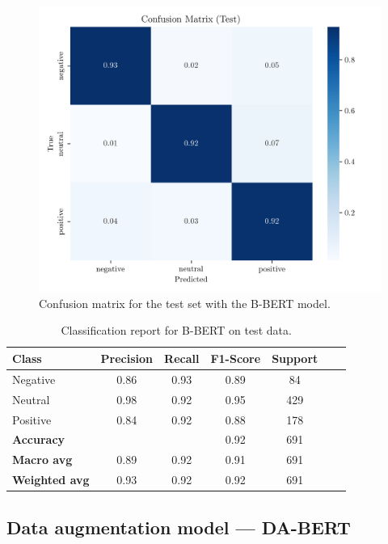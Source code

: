 \documentclass[conference]{IEEEtran}
\begin{document}
\begin{figure}[H]
    \centering
    \includegraphics[width=1\linewidth]{assets/base_bert_confusion_matrix_Test.png}
    \caption{Confusion matrix for the test set with the B-BERT model.}
    \label{fig:base_bert_confusion_matrix_Test}
\end{figure}

\begin{table}[H]
\centering
\caption{Classification report for B-BERT on test data.}
\label{cr_basebert_test}
\begin{tabular}{lcccccc}
\toprule
\textbf{Class} & \textbf{Precision} & \textbf{Recall} & \textbf{F1-Score} & \textbf{Support} \\
\midrule
Negative & 0.86 & 0.93 & 0.89 & 84 \\
Neutral & 0.98 & 0.92 & 0.95 & 429 \\
Positive & 0.84 & 0.92 & 0.88 & 178 \\
\midrule
\textbf{Accuracy} &  &  & 0.92 & 691 \\
\textbf{Macro avg} & 0.89 & 0.92 & 0.91 & 691 \\
\textbf{Weighted avg} & 0.93 & 0.92 & 0.92 & 691 \\
\bottomrule
\end{tabular}
\end{table}


\subsection{Data augmentation model — DA-BERT}
\end{document}
